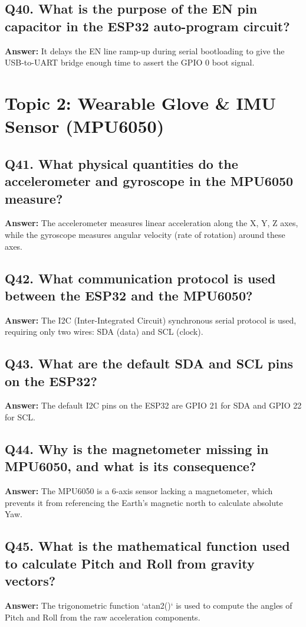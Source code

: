 \documentclass[12pt,a4paper,oneside]{report}
\begin{document}
\section{Q40. What is the purpose of the EN pin capacitor in the ESP32 auto-program circuit?}
\textbf{Answer:} It delays the EN line ramp-up during serial bootloading to give the USB-to-UART bridge enough time to assert the GPIO 0 boot signal.

\chapter{Topic 2: Wearable Glove \& IMU Sensor (MPU6050)}

\section{Q41. What physical quantities do the accelerometer and gyroscope in the MPU6050 measure?}
\textbf{Answer:} The accelerometer measures linear acceleration along the X, Y, Z axes, while the gyroscope measures angular velocity (rate of rotation) around these axes.

\section{Q42. What communication protocol is used between the ESP32 and the MPU6050?}
\textbf{Answer:} The I2C (Inter-Integrated Circuit) synchronous serial protocol is used, requiring only two wires: SDA (data) and SCL (clock).

\section{Q43. What are the default SDA and SCL pins on the ESP32?}
\textbf{Answer:} The default I2C pins on the ESP32 are GPIO 21 for SDA and GPIO 22 for SCL.

\section{Q44. Why is the magnetometer missing in MPU6050, and what is its consequence?}
\textbf{Answer:} The MPU6050 is a 6-axis sensor lacking a magnetometer, which prevents it from referencing the Earth's magnetic north to calculate absolute Yaw.

\section{Q45. What is the mathematical function used to calculate Pitch and Roll from gravity vectors?}
\textbf{Answer:} The trigonometric function `atan2()` is used to compute the angles of Pitch and Roll from the raw acceleration components.
\end{document}
